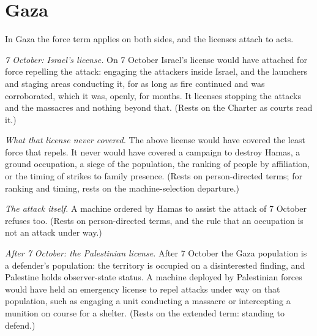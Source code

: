\section{Gaza}
\label{sec:6.8}
In Gaza the force term applies on both sides, and the licenses attach to acts.

\emph{7 October: Israel's license.} On 7 October Israel's license would have attached for force repelling the attack: engaging the attackers inside Israel, and the launchers and staging areas conducting it, for as long as fire continued and was corroborated, which it was, openly, for months.
It licenses stopping the attacks and the massacres and nothing beyond that. (Rests on the Charter as courts read it.)

\emph{What that license never covered.} The above license would have covered the least force that repels. It never would have covered a campaign to destroy Hamas, a ground occupation, a siege of the population, the ranking of people by affiliation, or the timing of strikes to family presence.
(Rests on person-directed terms; for ranking and timing, rests on the machine-selection departure.)

\emph{The attack itself.} A machine ordered by Hamas to assist the attack of 7 October refuses too.
(Rests on person-directed terms, and the rule that an occupation is not an attack under way.)

\emph{After 7 October: the Palestinian license.} After 7 October the Gaza population is a defender's population: the territory is occupied on a disinterested finding, and Palestine holds observer-state status. A machine deployed by Palestinian forces would have held an emergency license to repel attacks under way on that population, such as engaging a unit conducting a massacre or intercepting a munition on course for a shelter.
(Rests on the extended term: standing to defend.)

